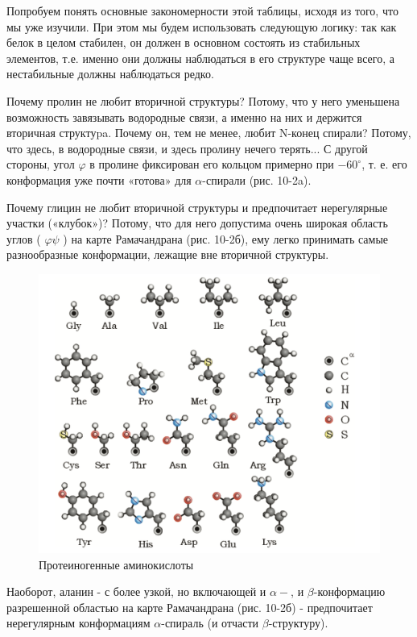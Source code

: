 \documentclass[
11pt,%
tightenlines,%
twoside,%
onecolumn,%
nofloats,%
nobibnotes,%
nofootinbib,%
superscriptaddress,%
noshowpacs,%
centertags]%
{revtex4}
\begin{document}
Попробуем понять основные закономерности этой таблицы, исходя из того, что мы уже изучили. При этом мы будем использовать следующую логику: так как белок в целом стабилен, он должен в основном состоять из стабильных элементов, т.е. именно они должны наблюдаться в его структуре чаще всего, а нестабильные должны наблюдаться редко.

Почему пролин не любит вторичной структуры? Потому, что у него уменьшена возможность завязывать водородные связи, а именно на них и держится вторичная структуpa. Почему он, тем не менее, любит N-конец спирали? Потому, что здесь, в водородные связи, и здесь пролину нечего терять... С другой стороны, угол $\varphi$ в пролине фиксирован его кольцом примерно при $-60^{\circ}$, т. е. его конформация уже почти «готова» для $\alpha$-спирали (рис. 10-2a).


Почему глицин не любит вторичной структуры и предпочитает нерегулярные участки («клубок»)? Потому, что для него допустима очень широкая область углов ( $\varphi \psi$ ) на карте Рамачандрана (рис. 10-2б), ему легко принимать самые разнообразные конформации, лежащие вне вторичной структуры.

\begin{figure}
	\centering
	\includegraphics[scale=0.3]{amin}
	\caption{Протеиногенные аминокислоты}
\end{figure}
Наоборот, аланин - с более узкой, но включающей и $\alpha-$, и $\beta$-конформацию разрешенной областью на карте Рамачандрана (рис. 10-2б) - предпочитает нерегулярным конформациям $\alpha$-спираль (и отчасти $\beta$-структуру).
\end{document}
